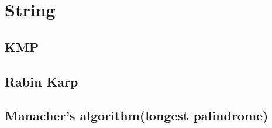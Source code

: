 \section{String}

\subsection{KMP}


\subsection{Rabin Karp}

\subsection{Manacher's algorithm(longest palindrome)}

